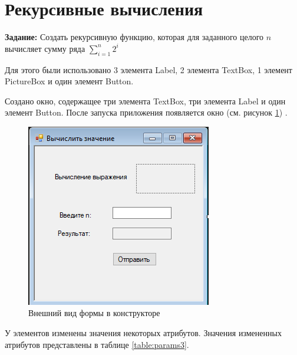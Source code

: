 \section{Рекурсивные вычисления}
\textbf{Задание:} Создать рекурсивную функцию, которая для заданного целого $n$
вычисляет сумму ряда $\displaystyle \sum\limits_{i=1}^n 2^i$

Для этого были использовано 3 элемента Label, 2 элемента TextBox, 1 элемент PictureBox
и один элемент Button. 

Создано окно, содержащее три элемента TextBox, три элемента Label и 
один элемент Button. После запуска приложения появляется окно (см. рисунок \ref{fig:form3}) .
\begin{figure}[H]
    \centering
    \includegraphics{task3/form.png}
    \caption{Внешний вид формы в конструкторе}
    \label{fig:form3}
\end{figure}

У элементов изменены значения некоторых атрибутов. 
Значения измененных атрибутов представлены в таблице \ref{table:params3}.

